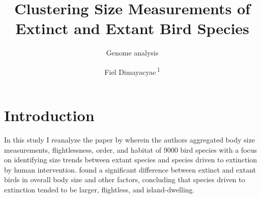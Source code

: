 \documentclass{bioinfo}
\begin{document}

\subtitle{Genome analysis}

\title[Clustering Bird Species]{Clustering Size Measurements of Extinct
and Extant Bird Species}

\author[FirstAuthorLastName \textit{et~al}.]{
Fiel Dimayacyac\,\textsuperscript{1}
}

\address{
\textsuperscript{1}University of British Columbia, Bioinformatics,
Vancouver, British Columbia\\
}

\corresp{}




\maketitle

\section{Introduction}

In this study I reanalyze the paper by \citet{fromm_big_2021} wherein
the authors aggregated body size measurements, flightlessness, order,
and habitat of 9000 bird species with a focus on identifying size trends
between extant species and species driven to extinction by human
intervention. \citet{fromm_big_2021} found a significant difference
between extinct and extant birds in overall body size and other factors,
concluding that species driven to extinction tended to be larger,
flightless, and island-dwelling.
\end{document}
